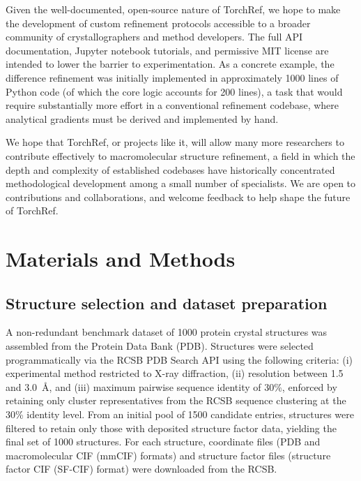 \documentclass{iucrjournals}
\begin{document}
Given the well-documented, open-source nature of TorchRef, we hope to make the
development of custom refinement protocols accessible to a broader community of
crystallographers and method developers.
The full API documentation, Jupyter notebook tutorials, and permissive MIT
license are intended to lower the barrier to experimentation.
As a concrete example, the difference refinement was initially implemented in
approximately \num{1000} lines of Python code (of which the core logic accounts for \num{200} lines), a
task that would require substantially more effort in a conventional refinement
codebase, where analytical gradients must be derived and implemented by hand.

We hope that TorchRef, or projects like it, will allow many more researchers to contribute effectively
to macromolecular structure refinement, a field in which the depth and complexity of established
codebases have historically concentrated methodological development among a small number of
specialists. We are open to contributions and collaborations, and welcome feedback to help shape the future of TorchRef.


\section{Materials and Methods}

\subsection{Structure selection and dataset preparation}

A non-redundant benchmark dataset of \num{1000} protein crystal structures was
assembled from the Protein Data Bank (PDB).
Structures were selected programmatically via the RCSB PDB Search API using the
following criteria:
(i) experimental method restricted to X-ray diffraction,
(ii) resolution between 1.5 and 3.0~\AA{}, and
(iii) maximum pairwise sequence identity of 30\%, enforced by retaining only
cluster representatives from the RCSB sequence clustering at the 30\% identity
level.
From an initial pool of \num{1500} candidate entries, structures were filtered to
retain only those with deposited structure factor data, yielding the final set
of \num{1000} structures.
For each structure, coordinate files (PDB and macromolecular CIF (mmCIF)
formats) and structure factor files (structure factor CIF (SF-CIF) format)
were downloaded from the RCSB.
\end{document}
